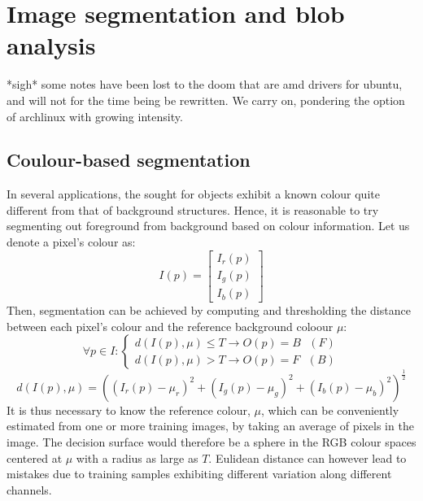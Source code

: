 \documentclass{article}
\begin{document}
\section{Image segmentation and blob analysis} 
*sigh* some notes have been lost to the doom that are amd drivers for ubuntu, and will not for the time being be rewritten. We carry on, pondering the option of archlinux with growing intensity.









\subsection{Coulour-based segmentation}
In several applications, the sought for objects exhibit a known colour quite different from that of background structures. Hence, it is reasonable to try segmenting out foreground from background based on colour information. Let us denote a pixel's colour as:
\[
    I(p)=\begin{bmatrix}
        I_r(p) \\
        I_g(p) \\
        I_b(p) 
    \end{bmatrix}
\]
Then, segmentation can be achieved by computing and thresholding the distance between each pixel's colour and the reference background coloour $\mu$:
\[
    \forall p \in I : \begin{cases}
        d(I(p),\mu)\leq T \rightarrow O(p) = B \text{ } (F)\\
        d(I(p),\mu) >T \rightarrow O(p) = F \text{ } (B)
    \end{cases}
\]
\[
    d(I(p),\mu) = ((I_r(p)-\mu_r)^2+(I_g(p)-\mu_g)^2+(I_b(p)-\mu_b)^2)^{\displaystyle\frac{1}{2}}
\]
It is thus necessary to know the reference colour, $\mu$, which can be conveniently estimated from one or more training images, by taking an average of pixels in the image. The decision surface would therefore be a sphere in the RGB colour spaces centered at $\mu$ with a radius as large as $T$. Eulidean distance can however lead to mistakes due to training samples exhibiting different variation along different channels.
\end{document}
